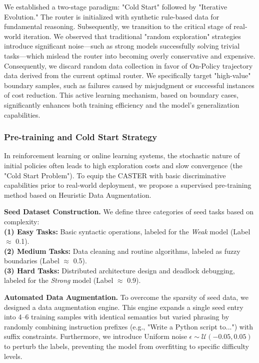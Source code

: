 \documentclass{article}
\theoremstyle{plain}
\theoremstyle{definition}
\theoremstyle{remark}
\begin{document}
We established a two-stage paradigm: "Cold Start" followed by "Iterative Evolution." The router is initialized with synthetic rule-based data for fundamental reasoning. Subsequently, we transition to the critical stage of real-world iteration. We observed that traditional "random exploration" strategies introduce significant noise—such as strong models successfully solving trivial tasks—which mislead the router into becoming overly conservative and expensive. Consequently, we discard random data collection in favor of On-Policy trajectory data derived from the current optimal router. We specifically target "high-value" boundary samples, such as failures caused by misjudgment or successful instances of cost reduction. This active learning mechanism, based on boundary cases, significantly enhances both training efficiency and the model's generalization capabilities.

\subsubsection{Pre-training and Cold Start Strategy}

In reinforcement learning or online learning systems, the stochastic nature of initial policies often leads to high exploration costs and slow convergence (the "Cold Start Problem"). To equip the CASTER with basic discriminative capabilities prior to real-world deployment, we propose a supervised pre-training method based on Heuristic Data Augmentation.


\textbf{Seed Dataset Construction.} We define three categories of seed tasks based on complexity:\\
\textbf{(1) Easy Tasks:} Basic syntactic operations, labeled for the \textit{Weak} model (Label $\approx$ 0.1). \\[3pt]
\textbf{(2) Medium Tasks:} Data cleaning and routine algorithms, labeled as fuzzy boundaries (Label $\approx$ 0.5). \\[3pt]
\textbf{(3) Hard Tasks:} Distributed architecture design and deadlock debugging, labeled for the \textit{Strong} model (Label $\approx$ 0.9).

\textbf{Automated Data Augmentation.} To overcome the sparsity of seed data, we designed a data augmentation engine. This engine expands a single seed entry into 4–6 training samples with identical semantics but varied phrasing by randomly combining instruction prefixes (e.g., "Write a Python script to...") with suffix constraints. Furthermore, we introduce Uniform noise $\epsilon \sim \mathcal{U}(-0.05, 0.05)$ to perturb the labels, preventing the model from overfitting to specific difficulty levels.
\end{document}
